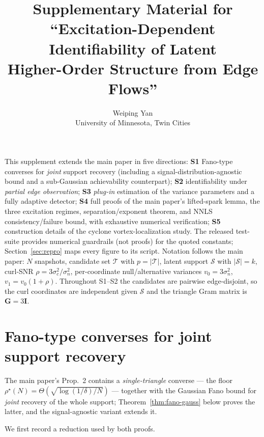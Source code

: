 \documentclass[11pt]{article}
\title{Supplementary Material for\\
``Excitation-Dependent Identifiability of Latent\\
Higher-Order Structure from Edge Flows''}
\author{Weiping Yan\\ \small University of Minnesota, Twin Cities}
\date{}
\newcommand{\Scal}{\mathcal{S}}
\newcommand{\Tcal}{\mathcal{T}}
\begin{document}
\maketitle

\noindent
This supplement extends the main paper in five directions: \textbf{S1}
Fano-type converses for \emph{joint} support recovery (including a
signal-distribution-agnostic bound and a sub-Gaussian achievability
counterpart); \textbf{S2} identifiability under \emph{partial edge
observation}; \textbf{S3} \emph{plug-in} estimation of the variance parameters
and a fully adaptive detector; \textbf{S4} full proofs of the main paper's
lifted-spark lemma, the three excitation regimes, separation/exponent theorem, and
NNLS consistency/failure bound, with exhaustive numerical verification;
\textbf{S5} construction details of
the cyclone vortex-localization study. The released test-suite provides numerical guardrails (not proofs) for the
quoted constants; Section~\ref{sec:repro} maps every figure to its script.
Notation follows the main paper: $N$ snapshots, candidate set $\Tcal$ with
$p=|\Tcal|$, latent support $\Scal$ with $|\Scal|=k$, curl-SNR
$\rho=3\sigma_c^2/\sigma_n^2$, per-coordinate null/alternative variances
$v_0=3\sigma_n^2$, $v_1=v_0(1+\rho)$. Throughout S1--S2 the candidates are
pairwise edge-disjoint, so the curl coordinates are independent given
$\Scal$ and the triangle Gram matrix is $\bm G=3\bm I$.

\section{Fano-type converses for joint support recovery}\label{sec:fano}

{\sloppy
The main paper's Prop.~2 contains a \emph{single-triangle} converse ---
the floor $\rho^\star(N)=\Theta(\sqrt{\log(1/\delta)/N})$ --- together
with the Gaussian Fano bound for \emph{joint} recovery of the whole support;
Theorem~\ref{thm:fano-gauss} below proves the latter, and the
signal-agnostic variant extends it.\par}

We first record a reduction used by both proofs.
\end{document}
